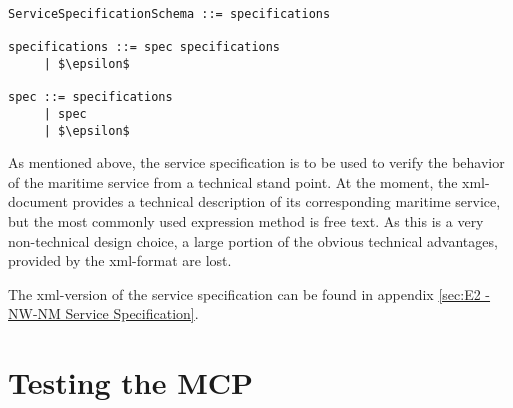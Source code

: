 \begin{lstlisting}[mathescape=true, keywordstyle={}, label={lst:sSpecReduced}, caption={Reduced parser grammar of Service Specification Schema},captionpos={below}]
ServiceSpecificationSchema ::= specifications

specifications ::= spec specifications
     | $\epsilon$
     
spec ::= specifications
     | spec
     | $\epsilon$
\end{lstlisting}

As mentioned above, the service specification is to be used to verify the behavior of the maritime service from a technical stand point. At the moment, the xml-document provides a technical description of its corresponding maritime service, but the most commonly used expression method is free text. As this is a very non-technical design choice, a large portion of the obvious technical advantages, provided by the xml-format are lost. 


The xml-version of the service specification can be found in appendix \ref{sec:E2 - NW-NM Service Specification}.

\section{Testing the MCP} %

